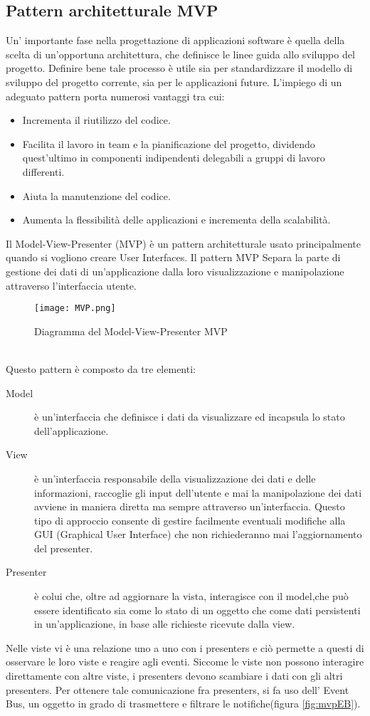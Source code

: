 \FloatBarrier
\subsection{Pattern architetturale MVP}

Un' importante fase nella progettazione di applicazioni software \`e quella della scelta di un'opportuna architettura, che definisce le linee guida allo sviluppo del progetto. Definire bene tale processo \`e utile sia per standardizzare il modello di sviluppo del progetto corrente, sia per le applicazioni
future.
L'impiego di un adeguato pattern porta numerosi vantaggi tra cui:
\begin{itemize}
\item Incrementa il riutilizzo del codice.
\item Facilita il lavoro in team e la pianificazione del progetto, dividendo
quest'ultimo in componenti indipendenti delegabili a gruppi di lavoro
differenti.
\item Aiuta la manutenzione del codice.
\item Aumenta la flessibilit\`a delle applicazioni e incrementa della scalabilit\`a.
\end{itemize}
Il Model-View-Presenter (MVP) \`e un pattern architetturale usato principalmente quando si vogliono creare User Interfaces. 
Il pattern MVP Separa la parte di gestione dei dati di un'applicazione dalla loro visualizzazione e manipolazione attraverso l'interfaccia utente. 
\begin{figure}[htbp]
\centering%
\texttt{[image: MVP.png]}%
\caption{Diagramma del Model-View-Presenter MVP}\label{fig:mvp}%
\end{figure}\\
Questo pattern \`e composto da tre elementi:
\begin{description}
\item[Model] \`e un'interfaccia che definisce i dati da visualizzare ed incapsula lo stato dell'applicazione.
\item[View] \`e un'interfaccia responsabile della visualizzazione dei
dati e delle informazioni, raccoglie gli input dell'utente e mai la manipolazione dei dati avviene in maniera diretta ma sempre attraverso un'interfaccia. Questo tipo di approccio consente di gestire facilmente eventuali modifiche alla GUI (Graphical User Interface) che non richiederanno mai l'aggiornamento del presenter.
\item[Presenter]  \`e colui che, oltre ad aggiornare la vista, interagisce con il model,che pu\`o essere identificato sia come lo stato di un oggetto che come dati persistenti in un'applicazione, in base alle richieste ricevute dalla view.
\end{description}
Nelle viste vi \`e una relazione uno a uno con i presenters e ci\`o permette a questi di osservare le loro viste e reagire agli eventi. Siccome le viste non possono interagire direttamente con altre viste, i presenters devono scambiare i dati con gli altri presenters. Per ottenere tale comunicazione  fra presenters, si fa uso dell' Event Bus, un oggetto in grado di trasmettere e filtrare le notifiche(figura \ref{fig:mvpEB}).

